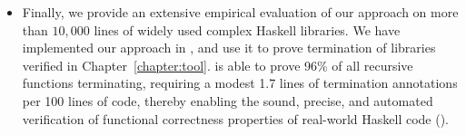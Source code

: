 \begin{itemize}
\item Finally, we provide an extensive empirical
evaluation of our approach on more than $10,000$ 
lines of widely used complex Haskell libraries.
We have implemented our approach in \toolname, 
and use it to prove termination of 
libraries verified in Chapter~\ref{chapter:tool}.
%
\toolname is able to prove 96\% of 
all recursive functions terminating, requiring a modest 
1.7 lines of termination annotations per 100 lines 
of code, thereby enabling the sound, precise, 
and automated verification of functional 
correctness properties of real-world Haskell code 
().
\end{itemize}
